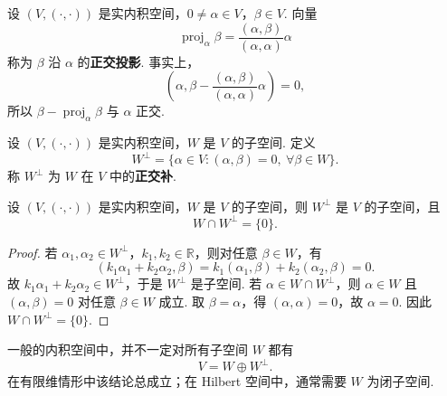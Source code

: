 \begin{definition}\label{p1:concept:c6-l245}
	设 $(V,(\cdot,\cdot))$ 是实内积空间，$0\ne\alpha\in V$，$\beta\in V$. 向量
	\[
	\operatorname{proj}_{\alpha}\beta=\frac{(\alpha,\beta)}{(\alpha,\alpha)}\alpha
	\]
	称为 $\beta$ 沿 $\alpha$ 的\textbf{正交投影}. 事实上，
	\[
	\left(\alpha,\beta-\frac{(\alpha,\beta)}{(\alpha,\alpha)}\alpha\right)=0,
	\]
	所以 $\beta-\operatorname{proj}_{\alpha}\beta$ 与 $\alpha$ 正交.
\end{definition}

\begin{definition}\label{p1:concept:c6-l257}
	设 $(V,(\cdot,\cdot))$ 是实内积空间，$W$ 是 $V$ 的子空间. 定义
	\[
	W^{\perp}=\{\alpha\in V:(\alpha,\beta)=0,\ \forall\beta\in W\}.
	\]
	称 $W^{\perp}$ 为 $W$ 在 $V$ 中的\textbf{正交补}.
\end{definition}

\begin{proposition}
	设 $(V,(\cdot,\cdot))$ 是实内积空间，$W$ 是 $V$ 的子空间，则 $W^{\perp}$ 是 $V$ 的子空间，且
	\[
	W\cap W^{\perp}=\{0\}.
	\]
\end{proposition}
\begin{proof}
	若 $\alpha_1,\alpha_2\in W^{\perp}$，$k_1,k_2\in\mathbb{R}$，则对任意 $\beta\in W$，有
	\[
	(k_1\alpha_1+k_2\alpha_2,\beta)=k_1(\alpha_1,\beta)+k_2(\alpha_2,\beta)=0.
	\]
	故 $k_1\alpha_1+k_2\alpha_2\in W^{\perp}$，于是 $W^{\perp}$ 是子空间.
	若 $\alpha\in W\cap W^{\perp}$，则 $\alpha\in W$ 且 $(\alpha,\beta)=0$ 对任意 $\beta\in W$ 成立. 取 $\beta=\alpha$，得 $(\alpha,\alpha)=0$，故 $\alpha=0$. 因此 $W\cap W^{\perp}=\{0\}$.
\end{proof}


	一般的内积空间中，并不一定对所有子空间 $W$ 都有
	\[
	V=W\oplus W^{\perp}.
	\]
	在有限维情形中该结论总成立；在 Hilbert 空间中，通常需要 $W$ 为闭子空间.




